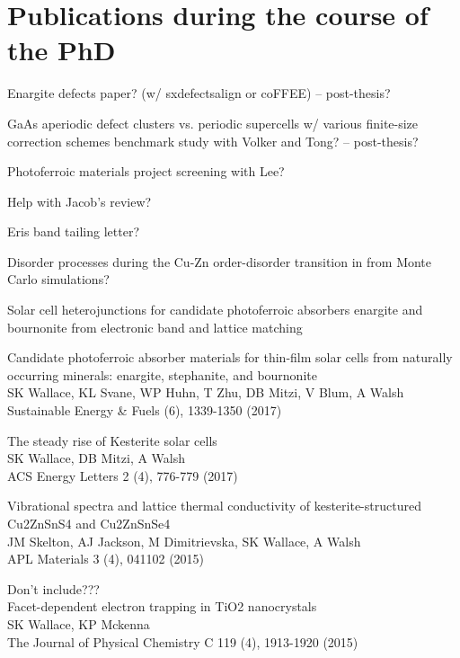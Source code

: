\documentclass[11pt, twoside]{report}
\begin{document}
\section*{Publications during the course of the PhD}
\begin{etaremune}
\item Enargite defects paper? (w/ sxdefectsalign or coFFEE) -- post-thesis?
\item GaAs aperiodic defect clusters vs. periodic supercells w/ various finite-size correction schemes benchmark study with Volker and Tong? -- post-thesis?
\item Photoferroic materials project screening with Lee?
\item Help with Jacob's review?
\item Eris band tailing letter?
\item Disorder processes during the Cu-Zn order-disorder transition in {\CZTS} from Monte Carlo simulations?
\item Solar cell heterojunctions for candidate photoferroic absorbers enargite
and bournonite from electronic band and lattice matching
\item Candidate photoferroic absorber materials for thin-film solar cells from naturally occurring minerals: enargite, stephanite, and bournonite\\
SK Wallace, KL Svane, WP Huhn, T Zhu, DB Mitzi, V Blum, A Walsh\\ Sustainable Energy \& Fuels  (6), 1339-1350 (2017)
\item The steady rise of Kesterite solar cells\\ SK Wallace, DB Mitzi, A Walsh\\ ACS Energy Letters 2 (4), 776-779 (2017)
\item Vibrational spectra and lattice thermal conductivity of kesterite-structured Cu2ZnSnS4 and Cu2ZnSnSe4\\ JM Skelton, AJ Jackson, M Dimitrievska, SK Wallace, A Walsh\\ APL Materials 3 (4), 041102 (2015)
\item Don't include???\\ Facet-dependent electron trapping in TiO2 nanocrystals\\ SK Wallace, KP Mckenna\\ The Journal of Physical Chemistry C 119 (4), 1913-1920 (2015)
\end{etaremune}


\tableofcontents
{}
\listoffigures
{}
\listoftables
{}
\end{document}
